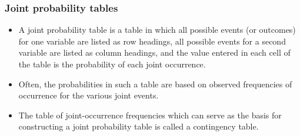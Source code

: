 \documentclass[slidemain.tex]{subfiles}
\begin{document}
\begin{frame}
	\frametitle{Joint probability tables}
	\begin{itemize}
	\item A joint probability table is a table in which all possible events (or outcomes) for one variable are listed as
	row headings, all possible events for a second variable are listed as column headings, and the value entered in
	each cell of the table is the probability of each joint occurrence. 
	
	\item Often, the probabilities in such a table are based
	on observed frequencies of occurrence for the various joint events. 
	\item The table
	of joint-occurrence frequencies which can serve as the basis for constructing a joint probability table is called a
	contingency table.
	\end{itemize}
\end{frame}
\end{document}
